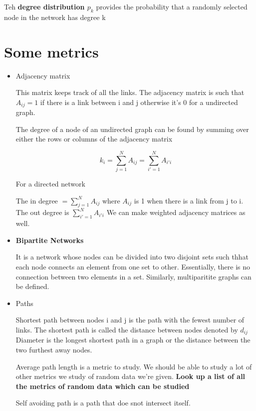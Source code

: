 \documentclass{article}
\begin{document}
Teh \textbf{ degree distribution $ p_k $ } provides the probability that a randomly selected node in the network has degree k  	



\section{Some metrics}

\begin{itemize}

\item Adjacency matrix 

	This matrix keeps track of all the links. The adjacency matrix is such that $ A_{ij} = 1  $ if there is a link between i and j otherwise it's 0 for a undirected graph. 

	The degree of a node of an undirected graph can be found by summing over either the rows or columns of the adjacency matrix

	\[  k_i = \sum_{ j=1 } ^ { N} A_{ij} = \sum_{ i'=1 } ^ { N} A_{i' i}                    \]
	
For a directed network

The in degree  $ = \sum_{ j = 1 } ^ { N} A_{ij} $ where $ A_{ij}  $ is 1 when there is a link from j to i. The out degree is $ \sum_{ i' = 1 } ^ { N} A_{i'i} $  
We can make weighted adjacency matrices as well. 


\item \textbf{ Bipartite Networks }

It is a network whose nodes can be divided into two disjoint sets such thhat each node connects an element from one set to other. Essentially, there is no connection between two elements in a set. Similarly, multiparitite graphs can be defined. 


\item Paths 

	Shortest path between nodes i and j is the path with the fewest number of links. The shortest path is called the distance between nodes denoted by $ d_{ij}  $ 
Diameter is the longest shortest path in a graph or the distance between the two furthest away nodes. 

Average path length is a metric to study. We should be able to study a lot of other metrics we study of random data we're given. \textbf{ Look up a list of all the metrics of random data which can be studied }

Self avoiding path is a path that doe snot intersect itself. 


\end{itemize}
\end{document}
